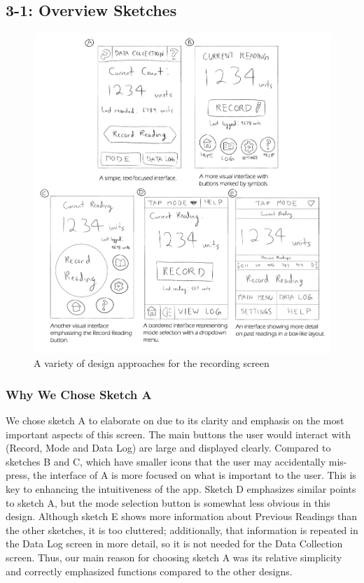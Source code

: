 \documentclass[11pt,a4paper]{article}
\begin{document}
\subsection*{3-1: Overview Sketches}
\bigskip
\begin{figure}[h]
  \centering
      \includegraphics[width=1.1\textwidth]{overviewsketches.png}
  \caption{A variety of design approaches for the recording screen}
\end{figure}

\newpage
\subsubsection*{Why We Chose Sketch A}

We chose sketch A to elaborate on due to its clarity and emphasis on the most important aspects of this screen. The main buttons the user would interact with (Record, Mode and Data Log) are large and displayed clearly. Compared to sketches B and C, which have smaller icons that the user may accidentally mis-press, the interface of A is more focused on what is important to the user. This is key to enhancing the intuitiveness of the app. Sketch D emphasizes similar points to sketch A, but the mode selection button is somewhat less obvious in this design. Although sketch E shows more information about Previous Readings than the other sketches, it is too cluttered; additionally, that information is repeated in the Data Log screen in more detail, so it is not needed for the Data Collection screen. Thus, our main reason for choosing sketch A was its relative simplicity and correctly emphasized functions compared to the other designs.
\end{document}
